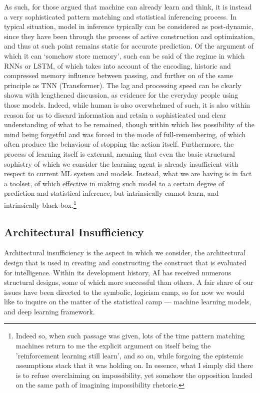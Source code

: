 As such, for those argued that machine can already learn and think, it is instead a very sophisticated pattern matching and statistical inferencing process. In typical situation, model in inference typically can be considered as post-dynamic, since they have been through the process of active construction and optimization, and thus at such point remains static for accurate prediction. Of the argument of which it can `somehow store memory', such can be said of the regime in which RNNs or LSTM, of which takes into account of the encoding, historic and compressed memory influence between passing, and further on of the same principle as TNN (Transformer). The lag and processing speed can be clearly shown with lengthened discussion, as evidence for the everyday people using those models. Indeed, while human is also overwhelmed of such, it is also within reason for us to discard information and retain a sophisticated and clear understanding of what to be remained, though within which lies possibility of the mind being forgetful and was forced in the mode of full-remembering, of which often produce the behaviour of stopping the action itself. Furthermore, the process of learning itself is external, meaning that even the basic structural sophistry of which we consider the learning agent is already insufficient with respect to current ML system and models. Instead, what we are having is in fact a toolset, of which effective in making such model to a certain degree of prediction and statistical inference, but intrinsically cannot learn, and intrinsically black-box.\footnote{Indeed so, when such passage was given, lots of the time pattern matching machines return to me the explicit argument on itself being the 'reinforcement learning still learn', and so on, while forgoing the epistemic assumptions stack that it was holding on. In essence, what I simply did there is to refuse overclaiming on impossibility, yet somehow the opposition landed on the same path of imagining impossibility rhetoric.}

\subsection{Architectural Insufficiency}

Architectural insufficiency is the aspect in which we consider, the architectural design that is used in creating and constructing the construct that is evaluated for intelligence. Within its development history, AI has received numerous structural designs, some of which more successful than others. A fair share of our issues have been directed to the symbolic, logicism camp, so for now we would like to inquire on the matter of the statistical camp --- machine learning models, and deep learning framework. 

